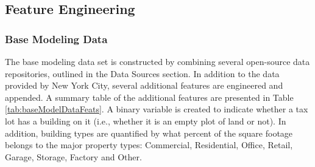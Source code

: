 \documentclass[12pt,]{article}
\begin{document}
\hypertarget{feature-engineering}{%
\subsection{Feature Engineering}\label{feature-engineering}}

\hypertarget{base-modeling-data}{%
\subsubsection{Base Modeling Data}\label{base-modeling-data}}

The base modeling data set is constructed by combining several
open-source data repositories, outlined in the Data Sources section. In
addition to the data provided by New York City, several additional
features are engineered and appended. A summary table of the additional
features are presented in Table \ref{tab:baseModelDataFeats}. A binary
variable is created to indicate whether a tax lot has a building on it
(i.e., whether it is an empty plot of land or not). In addition,
building types are quantified by what percent of the square footage
belongs to the major property types: Commercial, Residential, Office,
Retail, Garage, Storage, Factory and Other.
\end{document}
